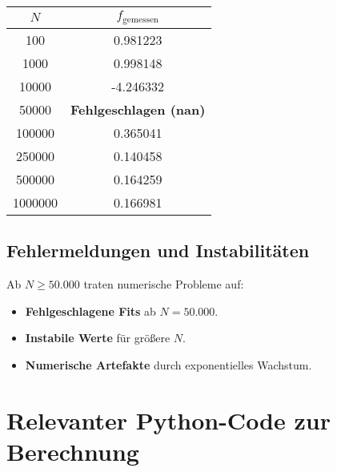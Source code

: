 \documentclass[a4paper,12pt]{article}
\begin{document}
\begin{center}
\begin{tabular}{|c|c|}
\hline
$N$ & $f_{\text{gemessen}}$ \\
\hline
100 & 0.981223 \\
1000 & 0.998148 \\
10000 & -4.246332 \\
50000 & \textbf{Fehlgeschlagen (nan)} \\
100000 & 0.365041 \\
250000 & 0.140458 \\
500000 & 0.164259 \\
1000000 & 0.166981 \\
\hline
\end{tabular}
\end{center}

\subsection{Fehlermeldungen und Instabilitäten}

Ab $N \geq 50.000$ traten numerische Probleme auf:

\begin{itemize}
    \item \textbf{Fehlgeschlagene Fits} ab $N = 50.000$.
    \item \textbf{Instabile Werte} für größere $N$.
    \item \textbf{Numerische Artefakte} durch exponentielles Wachstum.
\end{itemize}

\section{Relevanter Python-Code zur Berechnung}
\end{document}
